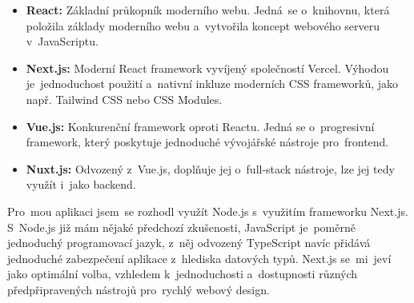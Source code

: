 \begin{itemize}
        \begin{itemize}
            \item \textbf{React:} Základní průkopník moderního webu.
                Jedná~se o~knihovnu, která položila základy moderního
                webu a~vytvořila koncept webového serveru v~JavaScriptu.
            \item \textbf{Next.js:} Moderní React framework vyvíjený
                společností Vercel. Výhodou je~jednoduchost použití
                a~nativní inkluze moderních CSS frameworků, jako např.
                Tailwind CSS nebo CSS Modules.
            \item \textbf{Vue.js:} Konkurenční framework oproti Reactu.
                Jedná se o~progresivní framework, který poskytuje jednoduché
                vývojářské nástroje pro~frontend.
            \item \textbf{Nuxt.js:} Odvozený z~Vue.js, doplňuje jej
                o~full-stack nástroje, lze jej tedy využít i~jako backend.
        \end{itemize}
\end{itemize}

Pro~mou aplikaci jsem~se rozhodl využít Node.js s~využitím frameworku Next.js.
S~Node.js již mám nějaké předchozí zkušenosti, JavaScript je~poměrně
jednoduchý programovací jazyk, z~něj odvozený TypeScript navíc přidává
jednoduché zabezpečení aplikace z~hlediska datových typů. Next.js se~mi~jeví
jako optimální volba, vzhledem k~jednoduchosti a~dostupnosti různých
předpřipravených nástrojů pro~rychlý webový design.

\endinput
